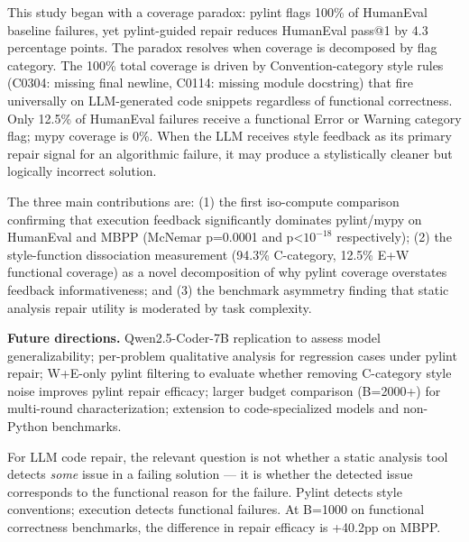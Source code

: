 
This study began with a coverage paradox: pylint flags 100\% of HumanEval baseline failures, yet pylint-guided repair reduces HumanEval pass@1 by 4.3 percentage points. The paradox resolves when coverage is decomposed by flag category. The 100\% total coverage is driven by Convention-category style rules (C0304: missing final newline, C0114: missing module docstring) that fire universally on LLM-generated code snippets regardless of functional correctness. Only 12.5\% of HumanEval failures receive a functional Error or Warning category flag; mypy coverage is 0\%. When the LLM receives style feedback as its primary repair signal for an algorithmic failure, it may produce a stylistically cleaner but logically incorrect solution.

The three main contributions are: (1) the first iso-compute comparison confirming that execution feedback significantly dominates pylint/mypy on HumanEval and MBPP (McNemar p=0.0001 and p<$10^{-18}$ respectively); (2) the style-function dissociation measurement (94.3\% C-category, 12.5\% E+W functional coverage) as a novel decomposition of why pylint coverage overstates feedback informativeness; and (3) the benchmark asymmetry finding that static analysis repair utility is moderated by task complexity.

\textbf{Future directions.} Qwen2.5-Coder-7B replication to assess model generalizability; per-problem qualitative analysis for regression cases under pylint repair; W+E-only pylint filtering to evaluate whether removing C-category style noise improves pylint repair efficacy; larger budget comparison (B=2000+) for multi-round characterization; extension to code-specialized models and non-Python benchmarks.

For LLM code repair, the relevant question is not whether a static analysis tool detects \textit{some} issue in a failing solution --- it is whether the detected issue corresponds to the functional reason for the failure. Pylint detects style conventions; execution detects functional failures. At B=1000 on functional correctness benchmarks, the difference in repair efficacy is +40.2pp on MBPP.

